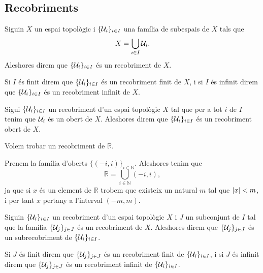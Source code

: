 \documentclass[../../Main.tex]{subfiles}
\begin{document}
	\subsection{Recobriments}
	\begin{definition}[Recobriment]
		\label{def:recobriment d'un espai}
		\label{def:recobriment finit d'un espai}
		\label{def:recobriment infinit d'un espai}
		Siguin \(X\) un espai topològic i \(\{\mathcal{U}_{i}\}_{i\in I}\) una família de subespais de \(X\) tals que
		\[
		    X=\bigcup_{i\in I}\mathcal{U}_{i}.
		\]
		Aleshores direm que \(\{\mathcal{U}_{i}\}_{i\in I}\) és un recobriment de \(X\).
		
		Si \(I\) és finit direm que \(\{\mathcal{U}_{i}\}_{i\in I}\) és un recobriment finit de \(X\), i si \(I\) és infinit direm que \(\{\mathcal{U}_{i}\}_{i\in I}\) és un recobriment infinit de \(X\).
	\end{definition}
	\begin{definition}
		\label{def:recobriment obert}
		Sigui \(\{\mathcal{U}_{i}\}_{i\in I}\) un recobriment d'un espai topològic \(X\) tal que per a tot \(i\) de \(I\) tenim que \(\mathcal{U}_{i}\) és un obert de \(X\). Aleshores direm que \(\{\mathcal{U}_{i}\}_{i\in I}\) és un recobriment obert de \(X\).
	\end{definition}
	\begin{example}
		\label{ex:un recobriment obert de R}
		Volem trobar un recobriment de \(\mathbb{R}\).
		\begin{solution}
			Prenem la família d'oberts \(\{(-i,i)\}_{i\in\mathbb{N}}\). Aleshores tenim que
			\[
			    \mathbb{R}=\bigcup_{i\in\mathbb{N}}(-i,i),
			\]
			ja que si \(x\) és un element de \(\mathbb{R}\) trobem que existeix un natural \(m\) tal que \(\abs{x}<m\), i per tant \(x\) pertany a l'interval \((-m,m)\).
		\end{solution}
	\end{example}
	\begin{definition}[Subrecobriment]
		\label{def:subrecobriment}
		\label{def:subrecobriment finit}
		\label{def:subrecobriment infinit}
		Siguin \(\{\mathcal{U}_{i}\}_{i\in I}\) un recobriment d'un espai topològic \(X\) i \(J\) un subconjunt de \(I\) tal que la família \(\{\mathcal{U}_{j}\}_{j\in J}\) és un recobriment de \(X\). Aleshores direm que \(\{\mathcal{U}_{j}\}_{j\in J}\) és un subrecobriment de \(\{\mathcal{U}_{i}\}_{i\in I}\).
		
		Si \(J\) és finit direm que \(\{\mathcal{U}_{j}\}_{j\in J}\) és un recobriment finit de \(\{\mathcal{U}_{i}\}_{i\in I}\), i si \(J\) és infinit direm que \(\{\mathcal{U}_{j}\}_{j\in J}\) és un recobriment infinit de \(\{\mathcal{U}_{i}\}_{i\in I}\).
	\end{definition}
\end{document}
